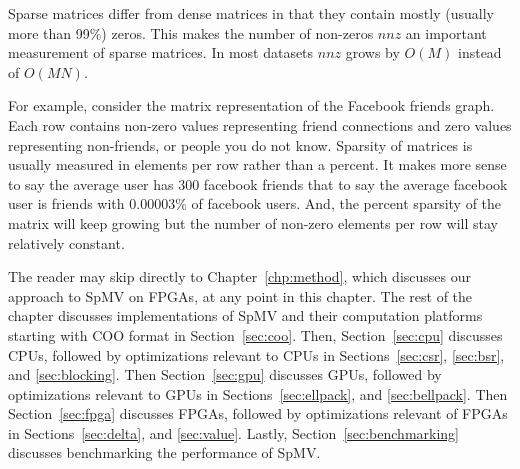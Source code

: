 \par Sparse matrices differ from dense matrices in that they contain mostly (usually more than 99\%) zeros. This makes the number of non-zeros $nnz$ an important measurement of sparse matrices. In most datasets $nnz$ grows by $O(M)$ instead of $O(MN)$.

For example, consider the matrix representation of the Facebook friends graph. Each row contains non-zero values representing friend connections and zero values representing non-friends, or people you do not know. Sparsity of matrices is usually measured in elements per row rather than a percent. It makes more sense to say the average user has 300 facebook friends that to say the average facebook user is friends with 0.00003\% of facebook users. And, the percent sparsity of the matrix will keep growing but the number of non-zero elements per row will stay relatively constant.

The reader may skip directly to Chapter~\ref{chp:method}, which discusses our approach to SpMV on FPGAs, at any point in this chapter. The rest of the chapter discusses implementations of SpMV and their computation platforms starting with COO format in Section~\ref{sec:coo}. Then, Section~\ref{sec:cpu} discusses CPUs, followed by optimizations relevant to CPUs in Sections~\ref{sec:csr}, \ref{sec:bsr}, and \ref{sec:blocking}. Then Section~\ref{sec:gpu} discusses GPUs, followed by optimizations relevant to GPUs in Sections~\ref{sec:ellpack}, and \ref{sec:bellpack}. Then Section~\ref{sec:fpga} discusses FPGAs, followed by optimizations relevant of FPGAs in Sections~\ref{sec:delta}, and \ref{sec:value}. Lastly, Section~\ref{sec:benchmarking} discusses benchmarking the performance of SpMV.

